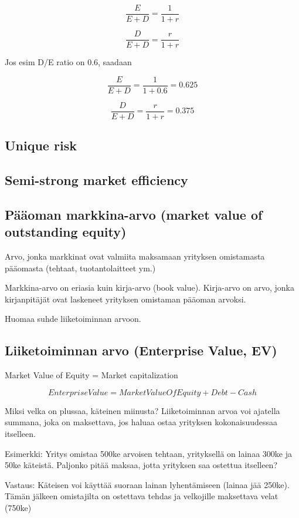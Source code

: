 \documentclass[a4paper]{article}
\begin{document}
\[
\frac{E}{E + D} = \frac{1}{1 +r}
\]

\[
\frac{D}{E + D} = \frac{r}{1 +r}
\]

Jos esim D/E ratio on 0.6, saadaan

\[
\frac{E}{E + D} = \frac{1}{1 + 0.6} = 0.625
\]

\[
\frac{D}{E + D} = \frac{r}{1 +r} = 0.375
\]

\subsection{Unique risk}

\subsection{Semi-strong market efficiency}

\subsection{Pääoman markkina-arvo (market value of outstanding equity)}

Arvo, jonka markkinat ovat valmiita maksamaan yrityksen omistamasta pääomasta (tehtaat, tuotantolaitteet ym.)

Markkina-arvo on eriasia kuin kirja-arvo (book value). Kirja-arvo on arvo, jonka kirjanpitäjät ovat laskeneet yrityksen omistaman pääoman arvoksi.

Huomaa suhde liiketoiminnan arvoon.

\subsection{Liiketoiminnan arvo (Enterprise Value, EV)}

Market Value of Equity = Market capitalization

\[Enterprise Value = Market Value Of Equity + Debt - Cash\]

Miksi velka on plussaa, käteinen miinusta? Liiketoiminnan arvoa voi ajatella summana, joka on maksettava, jos haluaa ostaa yrityksen kokonaisuudessaa itselleen.

Esimerkki: Yritys omistaa 500ke arvoisen tehtaan, yrityksellä on lainaa 300ke ja 50ke käteistä. Paljonko pitää maksaa, jotta yrityksen saa ostettua itselleen?

Vastaus: Käteisen voi käyttää suoraan lainan lyhentämiseen (lainaa jää 250ke). Tämän jälkeen omistajilta on ostettava tehdas ja velkojille maksettava velat (750ke)
\end{document}
